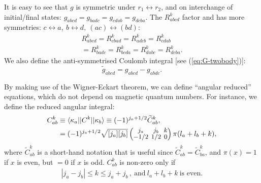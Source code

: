 \documentclass[10pt,twocolumn,a4paper]{article}%
\newcommand{\bra}[1]{\ensuremath{\langle #1|}}	%
\newcommand{\ket}[1]{\ensuremath{|#1\rangle}}	%
\newcommand{\threej}[6]{
\renewcommand\arraystretch{0.75}\setlength\arraycolsep{2pt}
\small\ensuremath{\begin{pmatrix}#1&#2&#3\\#4&#5&#6\end{pmatrix}}
}	%
\newcommand{\be}{\begin{equation}}
\newcommand{\ee}{\end{equation}}
\renewcommand{\k}{\ensuremath{\kappa}}
\begin{document}
It is easy to see that $g$ is symmetric under $r_1\leftrightarrow r_2$, and on interchange of initial/final states:
$g_{abcd} = g_{badc} = g_{cdab} = g_{dcba}$.
The $R^k_{abcd}$ factor and has more symmetries: $c\leftrightarrow a ,~ b\leftrightarrow d  ,~ (ac)\leftrightarrow (bd)$:
\begin{multline}
 R^k_{abcd} =R^k_{cbad} =R^k_{adcb} =R^k_{cdab} \\=R^k_{badc} =R^k_{bcda} =R^k_{dabc} =R^k_{dcba}.
\end{multline}
We also define the anti-symmetrised Coulomb integral [see (\ref{eq:G-twobody})]:
\be
 \widetilde g_{abcd} =  g_{abcd} -  g_{abdc}.
\ee


By making use of the Wigner-Eckart theorem, we can define ``angular reduced'' equations, which do not depend on magnetic quantum numbers.
%
For instance, we define the reduced angular integral:
\begin{align}
C^k_{ab}&\equiv \bra{\k_a}|C^k|\ket{\k_b} \equiv  (-1)^{j_a+1/2} \widetilde C^k_{ab} ,\\
&= (-1)^{j_a+1/2}\sqrt{[j_a][j_b]}\threej{j_a}{j_b}{k}{-1/2}{1/2}{0}\pi(l_a+l_b+k) ,
\end{align}
where $\widetilde C^k_{ab}$
 is a short-hand notation that is useful since $\widetilde C^k_{ab} = \widetilde C^k_{ba}$, and $\pi(x)=1$ if $x$ is even, but $=0$ if $x$ is odd.
$C^k_{ab}$ is non-zero only if
\begin{align}
|j_a-j_b|\leq k\leq j_a+j_b
\,,~\text{and}~ l_a + l_b + k~\text{is even}.
\end{align}
\end{document}
